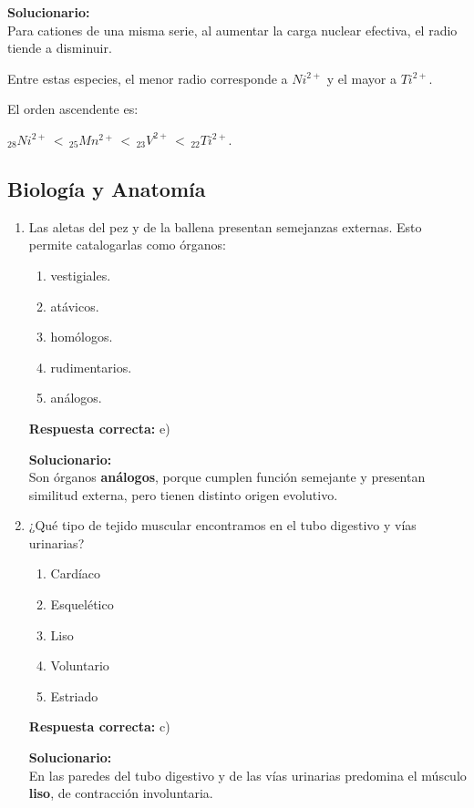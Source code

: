 \begin{enumerate}
	\vspace{2mm}
	\textbf{Solucionario:}\\
	Para cationes de una misma serie, al aumentar la carga nuclear efectiva, el radio tiende a disminuir.
	
	Entre estas especies, el menor radio corresponde a $Ni^{2+}$ y el mayor a $Ti^{2+}$.
	
	El orden ascendente es:
	
	${}_{28}Ni^{2+} \,<\, {}_{25}Mn^{2+} \,<\, {}_{23}V^{2+} \,<\, {}_{22}Ti^{2+}$.
	
	
	\vspace{6mm}
\end{enumerate}

\subsection*{Biología y Anatomía}

\begin{enumerate}

	
	\item Las aletas del pez y de la ballena presentan semejanzas externas. Esto permite catalogarlas como órganos:
	\begin{enumerate}[label=\alph*)]
		\item vestigiales.
		\item atávicos.
		\item homólogos.
		\item rudimentarios.
		\item análogos.
	\end{enumerate}
	\textbf{Respuesta correcta:} e)
	
	\vspace{2mm}
	\textbf{Solucionario:}\\
	Son órganos \textbf{análogos}, porque cumplen función semejante y presentan similitud externa, pero tienen distinto origen evolutivo.
	

	
	\vspace{6mm}
	
	\item ¿Qué tipo de tejido muscular encontramos en el tubo digestivo y vías urinarias?
	\begin{enumerate}[label=\alph*)]
		\item Cardíaco
		\item Esquelético
		\item Liso
		\item Voluntario
		\item Estriado
	\end{enumerate}
	\textbf{Respuesta correcta:} c)
	
	\vspace{2mm}
	\textbf{Solucionario:}\\
	En las paredes del tubo digestivo y de las vías urinarias predomina el músculo \textbf{liso}, de contracción involuntaria.
	

	\vspace{6mm}
\end{enumerate}

